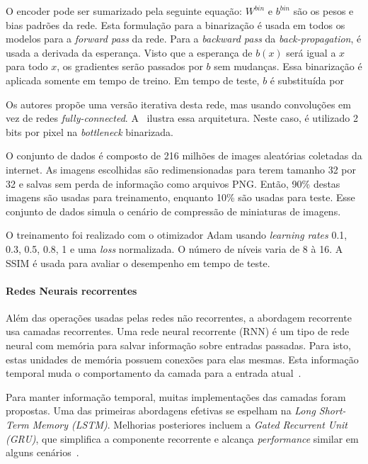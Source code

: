 O encoder pode ser sumarizado pela seguinte equação: 
$W^{bin}$ e $b^{bin}$ são os pesos e bias padrões da rede. Esta formulação para a binarização é usada em todos os modelos para a \textit{forward pass} da rede. Para a \textit{backward pass} da \textit{back-propagation}, é usada a derivada da esperança. Visto que a esperança de $b(x)$ será igual a $x$ para todo $x$, os gradientes serão passados por $b$ sem mudanças. Essa binarização é aplicada somente em tempo de treino. Em tempo de teste, $b$ é substituída por 

Os autores propõe uma versão iterativa desta rede, mas usando convoluções em vez de redes \textit{fully-connected}. A~ ilustra essa arquitetura. Neste caso, é utilizado 2 bits por pixel na \textit{bottleneck} binarizada.

O conjunto de dados é composto de 216 milhões de images aleatórias coletadas da internet. As imagens escolhidas são redimensionadas para terem tamanho 32 por 32 e salvas sem perda de informação como arquivos \acrshort{PNG}. Então, 90\% destas imagens são usadas para treinamento, enquanto 10\% são usadas para teste. Esse conjunto de dados simula o cenário de compressão de miniaturas de imagens.

O treinamento foi realizado com o otimizador Adam usando \textit{learning rates} {0.1, 0.3, 0.5, 0.8, 1} e uma \textit{loss} normalizada. O número de níveis varia de 8 à 16. A \acrshort{SSIM} é usada para avaliar o desempenho em tempo de teste. 

\paragraph{Redes Neurais recorrentes\\}
Além das operações usadas pelas redes não recorrentes, a abordagem recorrente usa camadas recorrentes. Uma rede neural recorrente (\acrshort{RNN}) é um tipo de rede neural com memória para salvar informação sobre entradas passadas. Para isto, estas unidades de memória possuem conexões para elas mesmas. Esta informação temporal muda o comportamento da camada para a entrada atual~\cite{Survey_CSVT2019}.

Para manter informação temporal, muitas implementações das camadas foram propostas. Uma das primeiras abordagens efetivas se espelham na \textit{Long Short-Term Memory (\acrshort{LSTM})}. Melhorias posteriores incluem a \textit{Gated Recurrent Unit (\acrshort{GRU})}, que simplifica a componente recorrente e alcança \textit{performance} similar em alguns cenários~\cite{Survey_CSVT2019}. 

